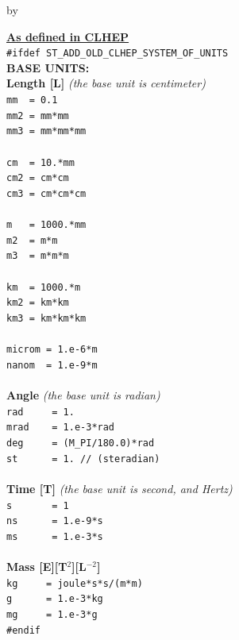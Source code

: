 \documentclass[twoside]{article}
\newcommand{\entrylabel}[1]{\mbox{\textbf{{#1}}}\hfil}%
\newenvironment{entry}
{\begin{list}{}%
    {\renewcommand{\makelabel}{\entrylabel}%
     \setlength{\labelwidth}{90pt}%
     \setlength{\leftmargin}{\labelwidth}
     \advance\leftmargin by \labelsep%
      }%
    }%
  {\end{list}}
\newcommand{\Entrylabel}[1]%
{\raisebox{0pt}[1ex][0pt]{\makebox[\labelwidth][l]%
    {\parbox[t]{\labelwidth}{\hspace{0pt}\textbf{{#1}}}}}}
\newenvironment{Entry}%
{\renewcommand{\entrylabel}{\Entrylabel}\begin{entry}}%
  {\end{entry}}
\begin{document}
\begin{description}
\begin{Entry}
  {\bf \underline{As defined in CLHEP}} \\
  \verb+#ifdef ST_ADD_OLD_CLHEP_SYSTEM_OF_UNITS+ \\  
{\bf BASE UNITS: \\Length [L]} {\it (the base unit is centimeter)}\\
  \verb+mm  = 0.1+ \\  
  \verb+mm2 = mm*mm+\\
  \verb+mm3 = mm*mm*mm+\\ \\
  \verb+cm  = 10.*mm+ \\
  \verb+cm2 = cm*cm+ \\
  \verb+cm3 = cm*cm*cm+ \\ \\
  \verb+m   = 1000.*mm+ \\  
  \verb+m2  = m*m+ \\
  \verb+m3  = m*m*m+ \\ \\
  \verb+km  = 1000.*m+ \\
  \verb+km2 = km*km+ \\
  \verb+km3 = km*km*km+ \\ \\
  \verb+microm = 1.e-6*m+ \\
  \verb+nanom  = 1.e-9*m+ \\ \\
  {\bf Angle} {\it (the base unit is radian)}\\
  \verb+rad     = 1.+  \\ 
  \verb+mrad    = 1.e-3*rad+  \\ 
  \verb+deg     = (M_PI/180.0)*rad+ \\
  \verb+st      = 1. // (steradian)+\\ \\
{\bf Time [T]} {\it (the base unit is second, and Hertz)}\\
  \verb#s       = 1# \\
  \verb+ns      = 1.e-9*s+ \\ 
  \verb+ms      = 1.e-3*s+ \\ \\ 
{\bf Mass [E][T$^{2}$][L$^{-2}$]} \\
  \verb+kg     = joule*s*s/(m*m)+ \\
  \verb+g      = 1.e-3*kg+ \\
  \verb+mg     = 1.e-3*g+ \\
  \verb+#endif+ \\ \\


\end{Entry}
\end{description}
\end{document}
